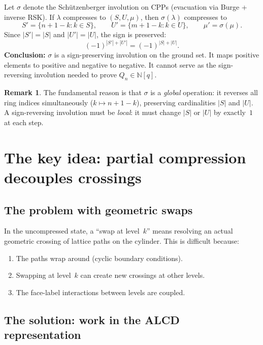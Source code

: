 \documentclass[11pt]{article}
\newcommand{\N}{\mathbb{N}}
\theoremstyle{plain}
\theoremstyle{definition}
\newtheorem{remark}[theorem]{Remark}
\begin{document}
Let $\sigma$ denote the Sch\"utzenberger involution on CPPs
(evacuation via Burge + inverse RSK).  If $\lambda$
compresses to $(S, U, \mu)$, then $\sigma(\lambda)$
compresses to
\[
  S' = \{n+1-k : k \in S\}, \qquad
  U' = \{m+1-k : k \in U\}, \qquad
  \mu' = \sigma(\mu).
\]
Since $|S'| = |S|$ and $|U'| = |U|$, the sign is preserved:
\[
  (-1)^{|S'|+|U'|} = (-1)^{|S|+|U|}.
\]
\textbf{Conclusion:} $\sigma$ is a sign-preserving involution
on the ground set.  It maps positive elements to positive and
negative to negative.  It cannot serve as the sign-reversing
involution needed to prove $Q_n \in \N[q]$.

\begin{remark}
The fundamental reason is that $\sigma$ is a \emph{global}
operation: it reverses all ring indices simultaneously
($k \mapsto n+1-k$), preserving cardinalities $|S|$ and $|U|$.
A sign-reversing involution must be \emph{local}: it must
change $|S|$ or $|U|$ by exactly~$1$ at each step.
\end{remark}


\section{The key idea: partial compression decouples crossings}

\subsection*{The problem with geometric swaps}

In the uncompressed state, a ``swap at level~$k$'' means
resolving an actual geometric crossing of lattice paths
on the cylinder.  This is difficult because:
\begin{enumerate}
  \item The paths wrap around (cyclic boundary conditions).
  \item Swapping at level~$k$ can create new crossings at
    other levels.
  \item The face-label interactions between levels are coupled.
\end{enumerate}

\subsection*{The solution: work in the ALCD representation}
\end{document}
